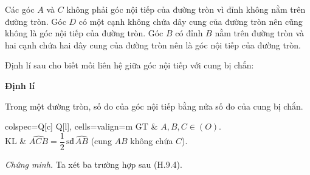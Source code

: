 \begin{lesson}
    Các góc $A$ và $C$ không phải góc nội tiếp của đường tròn vì đỉnh không nằm trên đường tròn. Góc $D$ có một cạnh không chứa dây cung của đường tròn nên cũng không là góc nội tiếp của đường tròn. Góc $B$ có đỉnh $B$ nằm trên đường tròn và hai cạnh chứa hai dây cung của đường tròn nên là góc nội tiếp của đường tròn.

    Định lí sau cho biết mối liên hệ giữa góc nội tiếp với cung bị chắn:

    \textbf{Định lí}

    \begin{keyconcept}
        Trong một đường tròn, số đo của góc nội tiếp bằng nửa số đo của cung bị chắn.
    \end{keyconcept}

    \begin{center}
    \begin{tblr}{
        colspec={Q[c] Q[l]},
        cells={valign=m}
    }
        GT & $A,B,C\in(O)$. \\
        KL & $\widehat{ACB}=\dfrac{1}{2}\,\text{sđ}\,\widehat{AB}$ (cung $AB$ không chứa $C$). \\
    \end{tblr}
    \end{center}

    \textit{Chứng minh.} Ta xét ba trường hợp sau (H.9.4).


\end{lesson}
